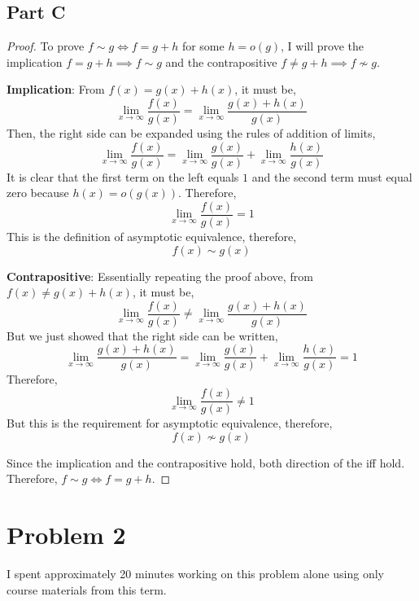 \documentclass{article}
\begin{document}
\break

\subsection*{Part C}

\begin{proof}
  To prove $f \sim g \iff f = g + h$ for some $h = o(g)$, I will prove the
  implication $ f = g + h \implies f \sim g $ and the contrapositive $ f \neq g
  + h \implies f \not\sim g $.

  \bigbreak

  \textbf{Implication}: From $f(x) = g(x) + h(x)$, it must be,
  $$ \lim_{x \to \infty} \frac{f(x)}{g(x)} = \lim_{x \to \infty} \frac{g(x) +
  h(x)}{g(x)} $$
  Then, the right side can be expanded using the rules of addition of limits,
  $$ \lim_{x \to \infty} \frac{f(x)}{g(x)} = \lim_{x \to \infty}
  \frac{g(x)}{g(x)} + \lim_{x \to \infty} \frac{h(x)}{g(x)} $$
  It is clear that the first term on the left equals $1$ and the second term
  must equal zero because $h(x) = o(g(x))$. Therefore,
  $$ \lim_{x \to \infty} \frac{f(x)}{g(x)} = 1 $$
  This is the definition of asymptotic equivalence, therefore,
  $$ f(x) \sim g(x) $$

  \bigbreak

  \textbf{Contrapositive}: Essentially repeating the proof above, from $f(x)
  \neq g(x) + h(x)$, it must be,
  $$ \lim_{x \to \infty} \frac{f(x)}{g(x)} \neq \lim_{x \to \infty} \frac{g(x) +
  h(x)}{g(x)} $$
  But we just showed that the right side can be written,
  $$ \lim_{x \to \infty} \frac{g(x) + h(x)}{g(x)} = \lim_{x \to \infty}
  \frac{g(x)}{g(x)} + \lim_{x \to \infty} \frac{h(x)}{g(x)} = 1 $$
  Therefore,
  $$ \lim_{x \to \infty} \frac{f(x)}{g(x)} \neq 1 $$
  But this is the requirement for asymptotic equivalence, therefore,
  $$ f(x) \not\sim g(x) $$

  \bigbreak

  Since the implication and the contrapositive hold, both direction of the iff
  hold. Therefore, $f \sim g \iff f = g + h$.

\end{proof}

\break

\section*{Problem 2}

I spent approximately 20 minutes working on this problem alone using only course
materials from this term.
\end{document}
